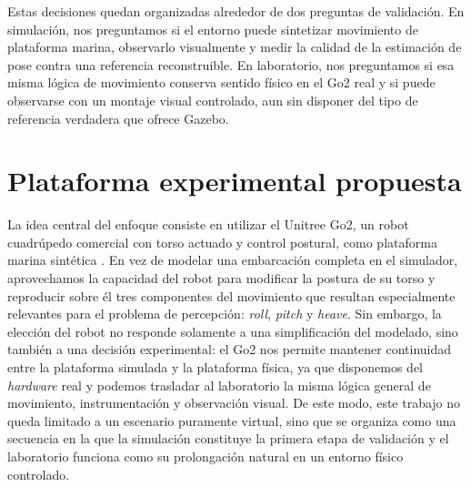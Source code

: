 \documentclass[12pt,a4paper]{report}
\begin{document}
Estas decisiones quedan organizadas alrededor de dos preguntas de validación. En
simulación, nos preguntamos si el entorno puede sintetizar movimiento de
plataforma marina, observarlo visualmente y medir la calidad de la estimación de
pose contra una referencia reconstruible. En laboratorio, nos preguntamos si esa
misma lógica de movimiento conserva sentido físico en el Go2 real y si puede
observarse con un montaje visual controlado, aun sin disponer del tipo de
referencia verdadera que ofrece Gazebo.

\section{Plataforma experimental propuesta}

La idea central del enfoque consiste en utilizar el Unitree Go2, un robot
cuadrúpedo comercial con torso actuado y control postural, como plataforma
marina sintética \citep{unitree_go2}. En vez de modelar una embarcación completa
en el simulador, aprovechamos la capacidad del robot para modificar la postura
de su torso y reproducir sobre él tres componentes del movimiento que resultan
especialmente relevantes para el problema de percepción: \textit{roll},
\textit{pitch} y \textit{heave}. Sin embargo, la elección del robot no responde
solamente a una simplificación del modelado, sino también a una decisión
experimental: el Go2 nos permite mantener
continuidad entre la plataforma simulada y la plataforma física, ya que
disponemos del \textit{hardware} real y podemos trasladar al laboratorio la misma lógica
general de movimiento, instrumentación y observación visual. De este modo, este
trabajo no queda limitado a un escenario puramente virtual, sino que se
organiza como una secuencia en la que la simulación constituye la primera etapa
de validación y el laboratorio funciona como su prolongación natural en un
entorno físico controlado.
\end{document}
